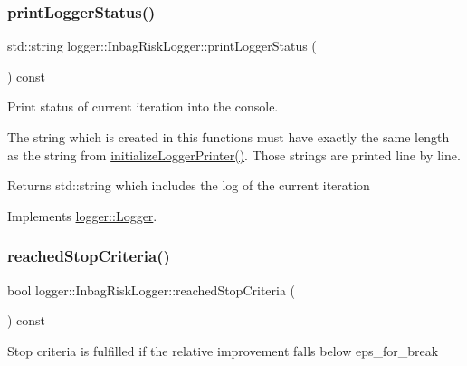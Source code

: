 \subsubsection{\texorpdfstring{print\+Logger\+Status()}{printLoggerStatus()}}
{\footnotesize\ttfamily std\+::string logger\+::\+Inbag\+Risk\+Logger\+::print\+Logger\+Status (\begin{DoxyParamCaption}{ }\end{DoxyParamCaption}) const\hspace{0.3cm}{\ttfamily [virtual]}}



Print status of current iteration into the console. 

The string which is created in this functions must have exactly the same length as the string from {\ttfamily \mbox{\hyperlink{classlogger_1_1_inbag_risk_logger_ab793454f28dae8d0901852b41a910ec7}{initialize\+Logger\+Printer()}}}. Those strings are printed line by line.

\begin{DoxyReturn}{Returns}
{\ttfamily std\+::string} which includes the log of the current iteration 
\end{DoxyReturn}


Implements \mbox{\hyperlink{classlogger_1_1_logger_abad818a7e8053ca84cb267e883b5e377}{logger\+::\+Logger}}.

\mbox{\label{classlogger_1_1_inbag_risk_logger_a17a7416e4cc9db4da3b3eda5012ad7c7}} 
\subsubsection{\texorpdfstring{reached\+Stop\+Criteria()}{reachedStopCriteria()}}
{\footnotesize\ttfamily bool logger\+::\+Inbag\+Risk\+Logger\+::reached\+Stop\+Criteria (\begin{DoxyParamCaption}{ }\end{DoxyParamCaption}) const\hspace{0.3cm}{\ttfamily [virtual]}}



Stop criteria is fulfilled if the relative improvement falls below {\ttfamily eps\+\_\+for\+\_\+break} 

